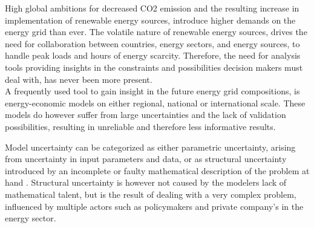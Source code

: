 

High global ambitions for decreased CO2 emission and the resulting increase in implementation of renewable energy sources, introduce higher demands on the energy grid than ever. The volatile nature of renewable energy sources, drives the need for collaboration between countries, energy sectors, and energy sources, to handle peak loads and hours of energy scarcity. Therefore, the need for analysis tools providing insights in the constraints and possibilities decision makers must deal with, has never been more present.  \\

A frequently used tool to gain insight in the future energy grid compositions, is energy-economic models on either regional, national or international scale. These models do however suffer from large uncertainties and the lack of validation possibilities, resulting in unreliable and therefore less informative results. 

Model uncertainty can be categorized as either parametric uncertainty, arising from uncertainty in input parameters and data, or as structural uncertainty introduced by an incomplete or faulty mathematical description of the problem at hand \cite{DeCarolis_MGA}. Structural uncertainty is however not caused by the modelers lack of mathematical talent, but is the result of dealing with a very complex problem, influenced by multiple actors such as policymakers and private company's in the energy sector. \\

\begin{comment}
- Increased demand and a need to reduce CO2 emmisions 
- Fundamental change is needed (policy wise)
- Energy-economy models is an important tool 
- Modelers should focus on robust insights rather than point estimates
- Uncertainty in the models (Structural and parametric)
- Structural uncertainty is addressed with higher comlexity
- Parametric uncertainty is addressed with running multiple scenarios or sensitivity analysis
- Scenario approach does not include less expected real-world developments 
- Little to none possibility to validate models 
\end{comment}


